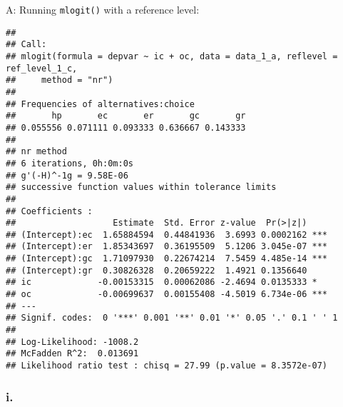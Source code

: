 \documentclass[
]{article}
\newenvironment{Shaded}{\begin{snugshade}}{\end{snugshade}}
\newcommand{\CommentTok}[1]{\textcolor[rgb]{0.56,0.35,0.01}{\textit{#1}}}
\newcommand{\DataTypeTok}[1]{\textcolor[rgb]{0.13,0.29,0.53}{#1}}
\newcommand{\DecValTok}[1]{\textcolor[rgb]{0.00,0.00,0.81}{#1}}
\newcommand{\KeywordTok}[1]{\textcolor[rgb]{0.13,0.29,0.53}{\textbf{#1}}}
\newcommand{\NormalTok}[1]{#1}
\newcommand{\OperatorTok}[1]{\textcolor[rgb]{0.81,0.36,0.00}{\textbf{#1}}}
\newcommand{\StringTok}[1]{\textcolor[rgb]{0.31,0.60,0.02}{#1}}
\begin{document}

A: Running \texttt{mlogit()} with a reference level:

\begin{Shaded}
\end{Shaded}

\begin{verbatim}
## 
## Call:
## mlogit(formula = depvar ~ ic + oc, data = data_1_a, reflevel = ref_level_1_c, 
##     method = "nr")
## 
## Frequencies of alternatives:choice
##       hp       ec       er       gc       gr 
## 0.055556 0.071111 0.093333 0.636667 0.143333 
## 
## nr method
## 6 iterations, 0h:0m:0s 
## g'(-H)^-1g = 9.58E-06 
## successive function values within tolerance limits 
## 
## Coefficients :
##                   Estimate  Std. Error z-value  Pr(>|z|)    
## (Intercept):ec  1.65884594  0.44841936  3.6993 0.0002162 ***
## (Intercept):er  1.85343697  0.36195509  5.1206 3.045e-07 ***
## (Intercept):gc  1.71097930  0.22674214  7.5459 4.485e-14 ***
## (Intercept):gr  0.30826328  0.20659222  1.4921 0.1356640    
## ic             -0.00153315  0.00062086 -2.4694 0.0135333 *  
## oc             -0.00699637  0.00155408 -4.5019 6.734e-06 ***
## ---
## Signif. codes:  0 '***' 0.001 '**' 0.01 '*' 0.05 '.' 0.1 ' ' 1
## 
## Log-Likelihood: -1008.2
## McFadden R^2:  0.013691 
## Likelihood ratio test : chisq = 27.99 (p.value = 8.3572e-07)
\end{verbatim}

\hypertarget{i.-1}{%
\subsubsection{i.}\label{i.-1}}
\end{document}
